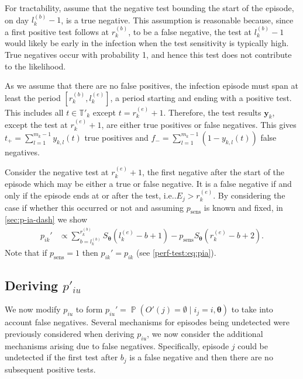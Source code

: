 \documentclass[12pt]{article}
\makeatletter
\DeclareMathOperator{\prob}{\mathbb{P}}
\renewcommand{\vec}[1]{\bm{#1}}
\newcommand{\psens}{p_\text{sens}}
\newcommand{\sched}{\mathbb{T}}
\DeclareRobustCommand\onedot{\futurelet\@let@token\@onedot}
\def\@onedot{\ifx\@let@token.\else.\null\fi\xspace}
\def\ie{i.e\onedot} \def\Ie{{I.e}\onedot}
\makeatother
\begin{document}

For tractability, assume that the negative test bounding the start of the episode, on day $l_k^{(b)}-1$, is a true negative.
This assumption is reasonable because, since a first positive test follows at $r_k^{(b)}$, to be a false negative, the test at $l_k^{(b)}-1$ would likely be early in the infection when the test sensitivity is typically high.
True negatives occur with probability 1, and hence this test does not contribute to the likelihood.

As we assume that there are no false positives, the infection episode must span at least the period $[r^{(b)}_k, l^{(e)}_k]$, a period starting and ending with a positive test.
This includes all $t \in \sched'_k$ except $t = r_k^{(e)}+1$.
Therefore, the test results $\vec{y}_k$, except the test at $r_k^{(e)}+1$, are either true positives or false negatives.
This gives $t_+ = \sum_{l=1}^{m_k-1} y_{k,l}(t)$ true positives and $f_- = \sum_{l=1}^{m_k-1} (1 - y_{k,l}(t))$ false negatives.

Consider the negative test at $r_k^{(e)}+1$, the first negative after the start of the episode which may be either a true or false negative.
It is a false negative if and only if the episode ends at or after the test, \ie $E_j > r_k^{(e)}$.
By considering the case if whether this occurred or not and assuming $\psens$ is known and fixed, in \cref{sec:p-ia-dash} we show
\begin{align}
p_{ik}'
&\propto \sum_{b = l_k^{(b)}}^{r_k^{(b)}} S_{\vec{\theta}}(l_k^{(e)} - b + 1) - p_\text{sens} S_{\vec{\theta}}(r_k^{(e)} - b + 2).
\label{imperf-test:eq:pia-prime-constant}
\end{align}
Note that if $p_\text{sens} = 1$ then $p_{ik}' = p_{ik}$ (see \cref{perf-test:eq:pia}).

\subsection{Deriving $p'_{iu}$} \label{imperf-test:sec:modifying-p_iu}

We now modify $p_{iu}$ to form $p_{iu}' = \prob(O'(j) = \emptyset \mid i_j = i, \vec{\theta})$ to take into account false negatives.
Several mechanisms for episodes being undetected were previously considered when deriving $p_{iu}$, we now consider the additional mechanisms arising due to false negatives.
Specifically, episode $j$ could be undetected if the first test after $b_j$ is a false negative and then there are no subsequent positive tests.
\end{document}
